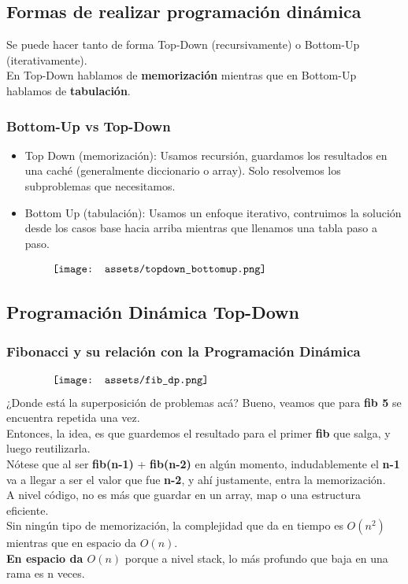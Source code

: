 \documentclass[10pt,a4paper]{article}
\begin{document}
\subsection*{Formas de realizar programación dinámica}
Se puede hacer tanto de forma Top-Down (recursivamente) o Bottom-Up (iterativamente). \\
En Top-Down hablamos de \textbf{memorización} mientras que en Bottom-Up hablamos de \textbf{tabulación}. 
\subsubsection*{Bottom-Up vs Top-Down}
\begin{itemize}
    \item Top Down (memorización): Usamos recursión, guardamos los resultados en una caché (generalmente diccionario o array). Solo resolvemos los subproblemas que necesitamos.
    \item Bottom Up (tabulación): Usamos un enfoque iterativo, contruimos la solución desde los casos base hacia arriba mientras que llenamos una tabla paso a paso. 
\end{itemize}
\[\begin{minipage}[b]{0.8\textwidth}
    \texttt{[image: assets/topdown\_bottomup.png]}
\end{minipage}\]
\subsection*{Programación Dinámica Top-Down}
\subsubsection*{Fibonacci y su relación con la Programación Dinámica}
\[\begin{minipage}[b]{0.8\textwidth}
    \texttt{[image: assets/fib\_dp.png]}
\end{minipage}\]
¿Donde está la superposición de problemas acá? Bueno, veamos que para \textbf{fib 5} se encuentra repetida una vez. \\
Entonces, la idea, es que guardemos el resultado para el primer \textbf{fib} que salga, y luego reutilizarla. \\
Nótese que al ser \textbf{fib(n-1)} + \textbf{fib(n-2)} en algún momento, indudablemente el \textbf{n-1} va a llegar a ser el valor que fue \textbf{n-2}, y ahí justamente, entra la memorización. \\
A nivel código, no es más que guardar en un array, map o una estructura eficiente. \\ 
Sin ningún tipo de memorización, la complejidad que da en tiempo es $O(n^{2})$ mientras que en espacio da $O(n)$. \\
\textbf{En espacio da $O(n)$} porque a nivel stack, lo más profundo que baja en una rama es n veces. 
\end{document}
